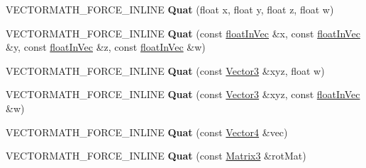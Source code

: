 \begin{DoxyCompactItemize}
\item 
\mbox{\label{classVectormath_1_1Aos_1_1Quat_affbeca410d11cee6e77ea27c610ab386}} 
V\+E\+C\+T\+O\+R\+M\+A\+T\+H\+\_\+\+F\+O\+R\+C\+E\+\_\+\+I\+N\+L\+I\+NE {\bfseries Quat} (float x, float y, float z, float w)
\item 
\mbox{\label{classVectormath_1_1Aos_1_1Quat_a72f6aa056be2f52ae1ff2175b3856060}} 
V\+E\+C\+T\+O\+R\+M\+A\+T\+H\+\_\+\+F\+O\+R\+C\+E\+\_\+\+I\+N\+L\+I\+NE {\bfseries Quat} (const \hyperlink{classVectormath_1_1floatInVec}{float\+In\+Vec} \&x, const \hyperlink{classVectormath_1_1floatInVec}{float\+In\+Vec} \&y, const \hyperlink{classVectormath_1_1floatInVec}{float\+In\+Vec} \&z, const \hyperlink{classVectormath_1_1floatInVec}{float\+In\+Vec} \&w)
\item 
\mbox{\label{classVectormath_1_1Aos_1_1Quat_a8af91b1419e8548fc2d987fc662dce64}} 
V\+E\+C\+T\+O\+R\+M\+A\+T\+H\+\_\+\+F\+O\+R\+C\+E\+\_\+\+I\+N\+L\+I\+NE {\bfseries Quat} (const \hyperlink{classVectormath_1_1Aos_1_1Vector3}{Vector3} \&xyz, float w)
\item 
\mbox{\label{classVectormath_1_1Aos_1_1Quat_a579880f622f65e2e6cf6e65ca3f12794}} 
V\+E\+C\+T\+O\+R\+M\+A\+T\+H\+\_\+\+F\+O\+R\+C\+E\+\_\+\+I\+N\+L\+I\+NE {\bfseries Quat} (const \hyperlink{classVectormath_1_1Aos_1_1Vector3}{Vector3} \&xyz, const \hyperlink{classVectormath_1_1floatInVec}{float\+In\+Vec} \&w)
\item 
\mbox{\label{classVectormath_1_1Aos_1_1Quat_a60356545117438d21499d0afd7d689da}} 
V\+E\+C\+T\+O\+R\+M\+A\+T\+H\+\_\+\+F\+O\+R\+C\+E\+\_\+\+I\+N\+L\+I\+NE {\bfseries Quat} (const \hyperlink{classVectormath_1_1Aos_1_1Vector4}{Vector4} \&vec)
\item 
\mbox{\label{classVectormath_1_1Aos_1_1Quat_a6ee788faa20607fe4c9823ef2065c689}} 
V\+E\+C\+T\+O\+R\+M\+A\+T\+H\+\_\+\+F\+O\+R\+C\+E\+\_\+\+I\+N\+L\+I\+NE {\bfseries Quat} (const \hyperlink{classVectormath_1_1Aos_1_1Matrix3}{Matrix3} \&rot\+Mat)
\item 
\mbox{\label{classVectormath_1_1Aos_1_1Quat_ab3080be7cc946bf0fe1388155d3df50a}} 

\end{DoxyCompactItemize}
